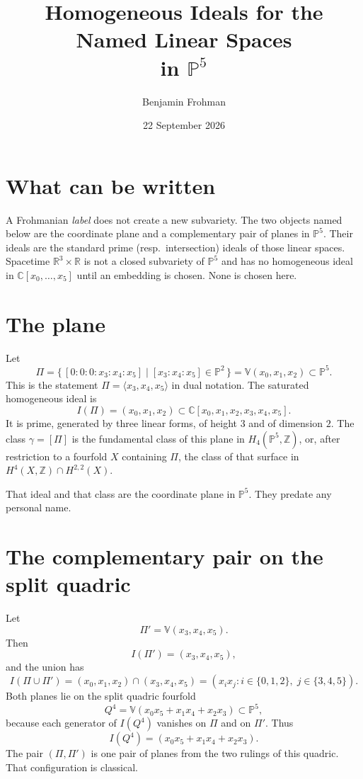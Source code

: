 \documentclass[11pt,a4paper]{article}
\title{Homogeneous Ideals for the Named Linear Spaces\\ in $\mathbb{P}^5$}
\author{Benjamin Frohman}
\date{22 September 2026}
\begin{document}
\maketitle

\section{What can be written}

A Frohmanian \emph{label} does not create a new subvariety. The two objects named below are the coordinate plane and a complementary pair of planes in $\mathbb{P}^5$. Their ideals are the standard prime (resp.\ intersection) ideals of those linear spaces. Spacetime $\mathbb{R}^3\times\mathbb{R}$ is not a closed subvariety of $\mathbb{P}^5$ and has no homogeneous ideal in $\mathbb{C}[x_0,\ldots,x_5]$ until an embedding is chosen. None is chosen here.

\section{The plane}

Let
\[
\Pi=\bigl\{\,[0:0:0:x_3:x_4:x_5]\;\big|\; [x_3:x_4:x_5]\in\mathbb{P}^2\,\bigr\}
=\mathbb{V}(x_0,x_1,x_2)\subset\mathbb{P}^5.
\]
This is the statement $\Pi=\langle x_3,x_4,x_5\rangle$ in dual notation. The saturated homogeneous ideal is
\begin{equation}
\label{eq:IC}
I(\Pi)=(x_0,x_1,x_2)\subset\mathbb{C}[x_0,x_1,x_2,x_3,x_4,x_5].
\end{equation}
It is prime, generated by three linear forms, of height $3$ and of dimension $2$. The class $\gamma=[\Pi]$ is the fundamental class of this plane in $H_4(\mathbb{P}^5,\mathbb{Z})$, or, after restriction to a fourfold $X$ containing $\Pi$, the class of that surface in $H^4(X,\mathbb{Z})\cap H^{2,2}(X)$.

That ideal and that class are the coordinate plane in $\mathbb{P}^5$. They predate any personal name.

\section{The complementary pair on the split quadric}

Let
\[
\Pi'=\mathbb{V}(x_3,x_4,x_5).
\]
Then
\begin{equation}
\label{eq:ICp}
I(\Pi')=(x_3,x_4,x_5),
\end{equation}
and the union has
\begin{equation}
\label{eq:Iunion}
I(\Pi\cup\Pi')
=(x_0,x_1,x_2)\cap(x_3,x_4,x_5)
=(x_ix_j:i\in\{0,1,2\},\; j\in\{3,4,5\}).
\end{equation}
Both planes lie on the split quadric fourfold
\begin{equation}
\label{eq:Q}
Q^4=\mathbb{V}(x_0x_5+x_1x_4+x_2x_3)\subset\mathbb{P}^5,
\end{equation}
because each generator of $I(Q^4)$ vanishes on $\Pi$ and on $\Pi'$. Thus
\[
I(Q^4)=(x_0x_5+x_1x_4+x_2x_3).
\]
The pair $(\Pi,\Pi')$ is one pair of planes from the two rulings of this quadric. That configuration is classical.
\end{document}
